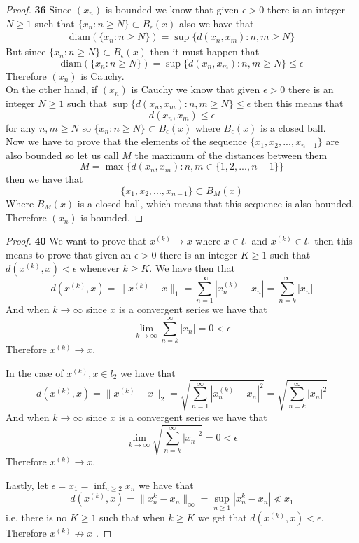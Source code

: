 \documentclass[11pt]{article}
\newcommand{\diam}{\text{diam}}
\theoremstyle{definition}
\begin{document}
    \begin{proof}{\textbf{36}}
        Since $(x_n)$ is bounded we know that given $\epsilon > 0$ there is an integer
        $N \geq 1$ such that $\{x_n: n \geq N\} \subset B_{\epsilon}(x)$ also we have
        that
        \begin{align*}
            \diam(\{x_n: n\geq N\}) = \sup\{d(x_n,x_m): n,m \geq N\} 
        \end{align*}
        But since $\{x_n: n \geq N\} \subset B_{\epsilon}(x)$ then it must happen that
        $$\diam(\{x_n: n\geq N\}) = \sup\{d(x_n,x_m): n,m \geq N\} \leq \epsilon$$
        Therefore $(x_n)$ is Cauchy.\\

        On the other hand, if $(x_n)$ is Cauchy we know that given $\epsilon > 0$ there
        is an integer $N \geq 1$ such that $\sup\{d(x_n,x_m): n,m \geq N\} \leq \epsilon$
        then this means that 
        $$d(x_n,x_m) \leq \epsilon$$
        for any $n,m \geq N$ so $\{x_n: n\geq N\} \subset B_{\epsilon}(x)$ where
        $B_{\epsilon}(x)$ is a closed ball.\\
        Now we have to prove that the elements of the sequence 
        $\{x_1, x_2, ..., x_{n-1}\}$ are also bounded so let us call $M$ the maximum of
        the distances between them 
        $$M = \max\{d(x_n, x_m) : n,m \in \{1,2,...,n-1\}\}$$
        then we have that
        $$\{x_1, x_2, ..., x_{n-1}\} \subset B_M(x)$$
        Where $B_M(x)$ is a closed ball, which means that this sequence is also bounded.
        Therefore $(x_n)$ is bounded.
    \end{proof}
\cleardoublepage
    \begin{proof}{\textbf{40}}
        We want to prove that $x^{(k)} \rightarrow x$ where $x \in l_1$ and
        $x^{(k)} \in l_1$ then this means to prove that given an $\epsilon >0$ there is
        an integer $K \geq 1$ such that $d(x^{(k)}, x) < \epsilon$ whenever $k \geq K$.
        We have then that
        $$d(x^{(k)}, x) = \|x^{(k)} - x\|_1 = \sum_{n=1}^\infty |x_n^{(k)} - x_n|
        = \sum_{n=k}^\infty |x_n|$$
        And when $k \rightarrow \infty$ since $x$ is a convergent series we have that
        $$\lim_{k \to \infty}\sum_{n=k}^\infty |x_n| = 0 < \epsilon$$
        Therefore $x^{(k)} \to x$.

        In the case of $x^{(k)}, x \in l_2$ we have that
        $$d(x^{(k)}, x) = \|x^{(k)} - x\|_2 = \sqrt{\sum_{n=1}^\infty |x_n^{(k)} - x_n|^2}
        = \sqrt{\sum_{n=k}^\infty |x_n|^2}$$
        And when $k \rightarrow \infty$ since $x$ is a convergent series we have that
        $$\lim_{k \to \infty}\sqrt{\sum_{n=k}^\infty |x_n|^2} = 0 < \epsilon$$
        Therefore $x^{(k)} \to x$.

        Lastly, let $\epsilon = x_1 = \inf_{n \geq 2} x_n$ we have that
        $$d(x^{(k)}, x) = \|x_n^{k} - x_n\|_\infty = \sup_{n\geq 1} |x_n^{k} - x_n| \not< x_1$$
        i.e. there is no $K \geq 1$ such that when $k \geq K$ we get that
        $d(x^{(k)}, x) < \epsilon$.
        Therefore $x^{(k)} \not \to x$ .        
    \end{proof}
\end{document}
